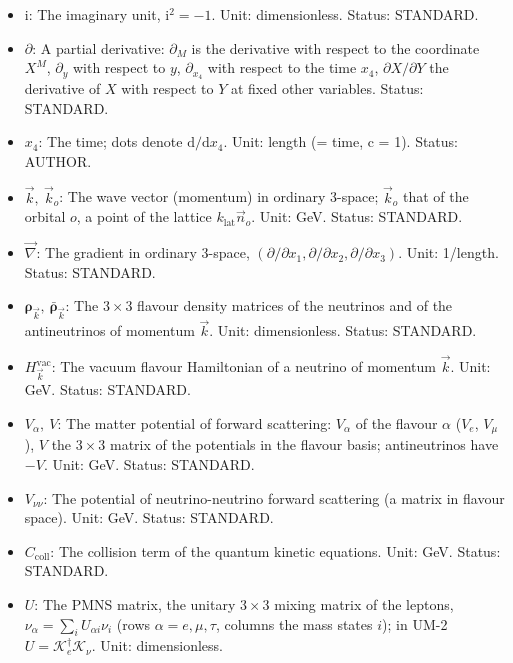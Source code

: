 \documentclass[
  10pt,
]{article}
\providecommand{\tightlist}{%
  \setlength{\itemsep}{0pt}\setlength{\parskip}{0pt}}
\begin{document}
\begin{itemize}
\tightlist
\item
  \(\mathrm{i}\): The imaginary unit, \(\mathrm{i}^2 = -1\). Unit:
  dimensionless. Status: STANDARD.
\item
  \(\partial\): A partial derivative: \(\partial_M\) is the derivative
  with respect to the coordinate \(X^M\), \(\partial_y\) with respect to
  \(y\), \(\partial_{x_4}\) with respect to the time \(x_4\),
  \(\partial X/\partial Y\) the derivative of \(X\) with respect to
  \(Y\) at fixed other variables. Status: STANDARD.
\item
  \(x_4\): The time; dots denote \(\mathrm{d}/\mathrm{d}x_4\). Unit:
  length (= time, c = 1). Status: AUTHOR.
\item
  \(\vec k,\ \vec k_o\): The wave vector (momentum) in ordinary 3-space;
  \(\vec k_o\) that of the orbital \(o\), a point of the lattice
  \(k_{\mathrm{lat}}\vec n_o\). Unit: GeV. Status: STANDARD.
\item
  \(\vec\nabla\): The gradient in ordinary 3-space,
  \((\partial/\partial x_1, \partial/\partial x_2, \partial/\partial x_3)\).
  Unit: 1/length. Status: STANDARD.
\item
  \(\boldsymbol{\rho}_{\vec k},\ \bar{\boldsymbol{\rho}}_{\vec k}\): The
  \(3 \times 3\) flavour density matrices of the neutrinos and of the
  antineutrinos of momentum \(\vec k\). Unit: dimensionless. Status:
  STANDARD.
\item
  \(H^{\mathrm{vac}}_{\vec k}\): The vacuum flavour Hamiltonian of a
  neutrino of momentum \(\vec k\). Unit: GeV. Status: STANDARD.
\item
  \(V_\alpha,\ V\): The matter potential of forward scattering:
  \(V_\alpha\) of the flavour \(\alpha\) (\(V_e\), \(V_\mu\)), \(V\) the
  \(3 \times 3\) matrix of the potentials in the flavour basis;
  antineutrinos have \(-V\). Unit: GeV. Status: STANDARD.
\item
  \(V_{\nu\nu}\): The potential of neutrino-neutrino forward scattering
  (a matrix in flavour space). Unit: GeV. Status: STANDARD.
\item
  \(C_{\mathrm{coll}}\): The collision term of the quantum kinetic
  equations. Unit: GeV. Status: STANDARD.
\item
  \(U\): The PMNS matrix, the unitary \(3 \times 3\) mixing matrix of
  the leptons, \(\nu_\alpha = \sum_iU_{\alpha i}\nu_i\) (rows
  \(\alpha = e, \mu, \tau\), columns the mass states \(i\)); in UM-2
  \(U = \mathcal{K}_e^\dagger\mathcal{K}_\nu\). Unit: dimensionless.

\end{itemize}
\end{document}
